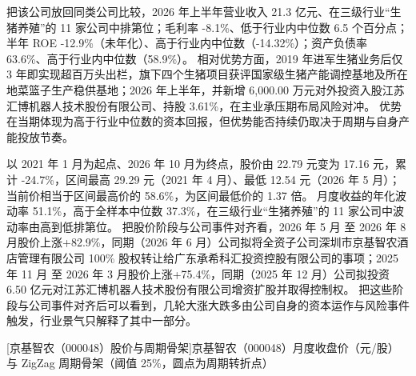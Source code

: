  把该公司放回同类公司比较，2026 年上半年营业收入 21.3 亿元、在三级行业“生猪养殖”的 11 家公司中排第位；毛利率 -8.1\%、低于行业内中位数 6.5 个百分点；半年 ROE -12.9\%（未年化）、高于行业内中位数（-14.32\%）；资产负债率 63.6\%、高于行业内中位数（58.9\%）。 相对优势方面，2019 年进军生猪业务后仅 3 年即实现超百万头出栏，旗下四个生猪项目获评国家级生猪产能调控基地及所在地菜篮子生产稳供基地；2026 年上半年，并新增 6,000.00 万元对外投资入股江苏汇博机器人技术股份有限公司、持股 3.61\%，在主业承压期布局风险对冲。 优势在当期体现为高于行业中位数的资本回报，但优势能否持续仍取决于周期与自身产能投放节奏。

 以 2021 年 1 月为起点、2026 年 10 月为终点，股价由 22.79 元变为 17.16 元，累计 -24.7\%，区间最高 29.29 元（2021 年 4 月）、最低 12.54 元（2026 年 5 月）；当前价相当于区间最高价的 58.6\%，为区间最低价的 1.37 倍。 月度收益的年化波动率 51.1\%，高于全样本中位数 37.3\%，在三级行业“生猪养殖”的 11 家公司中波动率由高到低排第位。 把股价阶段与公司事件对齐看，2026 年 5 月 至 2026 年 8 月股价上涨+82.9\%，同期（2026 年 6 月）公司拟将全资子公司深圳市京基智农酒店管理有限公司 100\% 股权转让给广东承希科汇投资控股有限公司的事项；2025 年 11 月 至 2026 年 3 月股价上涨+75.4\%，同期（2025 年 12 月）公司拟投资 6.50 亿元对江苏汇博机器人技术股份有限公司增资扩股并取得控制权。 把这些阶段与公司事件对齐后可以看到，几轮大涨大跌多由公司自身的资本运作与风险事件触发，行业景气只解释了其中一部分。

\begin{center}
\begin{minipage}{\textwidth}\centering
{}

[京基智农（000048）股价与周期骨架]{京基智农（000048）月度收盘价（元/股）与 ZigZag 周期骨架（阈值 25\%，圆点为周期转折点）}
\end{minipage}
\end{center}

